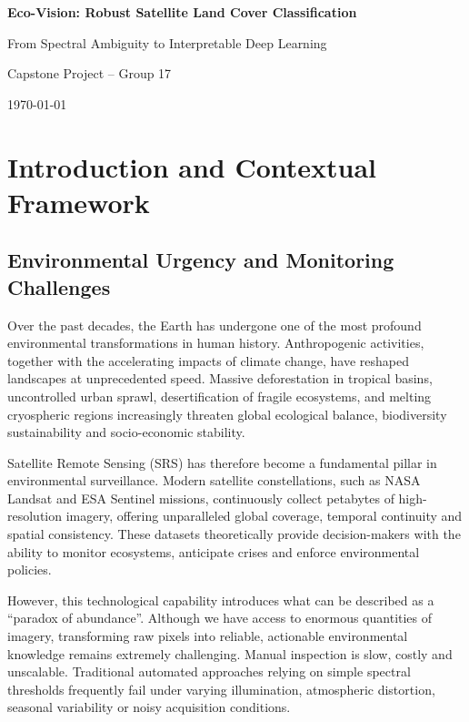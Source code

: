 \documentclass[12pt,a4paper]{report}
\begin{document}
\begin{titlepage}
\centering
\vspace*{3cm}

{\Huge \textbf{Eco-Vision: Robust Satellite Land Cover Classification} \par}

\vspace{0.8cm}
{\Large From Spectral Ambiguity to Interpretable Deep Learning\par}

\vspace{2cm}
{\Large Capstone Project – Group 17}

\vfill
{\Large \today}

\end{titlepage}

\tableofcontents
\listoffigures
\listoftables
\newpage

\chapter{Introduction and Contextual Framework}

\section{Environmental Urgency and Monitoring Challenges}

Over the past decades, the Earth has undergone one of the most profound environmental transformations in human history. Anthropogenic activities, together with the accelerating impacts of climate change, have reshaped landscapes at unprecedented speed. Massive deforestation in tropical basins, uncontrolled urban sprawl, desertification of fragile ecosystems, and melting cryospheric regions increasingly threaten global ecological balance, biodiversity sustainability and socio-economic stability.

Satellite Remote Sensing (SRS) has therefore become a fundamental pillar in environmental surveillance. Modern satellite constellations, such as NASA Landsat and ESA Sentinel missions, continuously collect petabytes of high-resolution imagery, offering unparalleled global coverage, temporal continuity and spatial consistency. These datasets theoretically provide decision-makers with the ability to monitor ecosystems, anticipate crises and enforce environmental policies.

However, this technological capability introduces what can be described as a “paradox of abundance”. Although we have access to enormous quantities of imagery, transforming raw pixels into reliable, actionable environmental knowledge remains extremely challenging. Manual inspection is slow, costly and unscalable. Traditional automated approaches relying on simple spectral thresholds frequently fail under varying illumination, atmospheric distortion, seasonal variability or noisy acquisition conditions.
\end{document}
